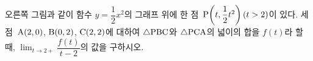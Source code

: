 \noindent\begin{minipage}[t]{0.58\linewidth}\vspace{0pt}\raggedright 오른쪽 그림과 같이 함수 $y=\dfrac{1}{2}x^2$의 그래프 위에 한 점~$\mathrm{P}\!\left(t{,}\mkern3mu\mathopen{}\dfrac{1}{2}t^2\right)(t>2)$이 있다. 세 점~$\mathrm{A}(2{,}\mkern3mu\mathopen{}0)$, $\mathrm{B}(0{,}\mkern3mu\mathopen{}2)$, $\mathrm{C}(2{,}\mkern3mu\mathopen{}2)$에 대하여 $\triangle\mathrm{PBC}$와 $\triangle\mathrm{PCA}$의 넓이의 합을 $f(t)$라 할 때, $\displaystyle\lim_{t\to 2+}\dfrac{f(t)}{t-2}$의 값을 구하시오.\end{minipage}\hfill\begin{minipage}[t]{0.4\linewidth}\vspace{0pt}\centering \resizebox{\ifdim\width>\linewidth\linewidth\else\width\fi}{!}{}\end{minipage}\par
